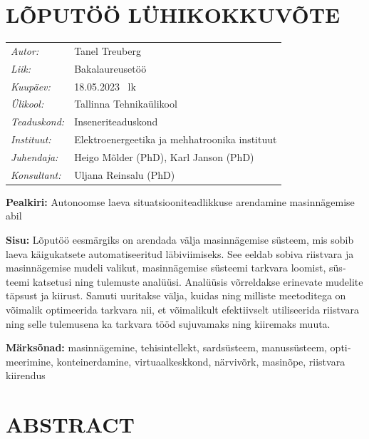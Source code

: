 \documentclass[12pt,a4paper]{report}
\begin{document}
\section*{LÕPUTÖÖ LÜHIKOKKUVÕTE}
\begin{otherlanguage}{estonian}
\noindent
\begin{tabular}{@{}ll@{}}
  \emph{Autor:}     & Tanel Treuberg \\
  \emph{Liik:}      & Bakalaureusetöö \\
  \emph{Kuupäev:}   & 18.05.2023 \quad 58~lk \\
  \emph{Ülikool:}   & Tallinna Tehnikaülikool \\
  \emph{Teaduskond:}& Inseneriteaduskond \\
  \emph{Instituut:} & Elektroenergeetika ja mehhatroonika instituut \\
  \emph{Juhendaja:} & Heigo Mõlder (PhD), Karl Janson (PhD) \\
  \emph{Konsultant:}& Uljana Reinsalu (PhD) \\
\end{tabular}

\vspace{0.5em}
\noindent\textbf{Pealkiri:} Autonoomse laeva situatsiooniteadlikkuse arendamine masinnägemise abil

\vspace{0.5em}
\noindent\textbf{Sisu:} Lõputöö eesmärgiks on arendada välja masinnägemise süsteem, mis sobib
laeva käigukatsete automatiseeritud läbiviimiseks. See eeldab sobiva riistvara ja masinnägemise
mudeli valikut, masinnägemise süsteemi tarkvara loomist, süsteemi katsetusi ning tulemuste
analüüsi. Analüüsis võrreldakse erinevate mudelite täpsust ja kiirust. Samuti uuritakse välja,
kuidas ning milliste meetoditega on võimalik optimeerida tarkvara nii, et võimalikult efektiivselt
utiliseerida riistvara ning selle tulemusena ka tarkvara tööd sujuvamaks ning kiiremaks muuta.

\vspace{0.5em}
\noindent\textbf{Märksõnad:} masinnägemine, tehisintellekt, sardsüsteem, manussüsteem,
optimeerimine, konteinerdamine, virtuaalkeskkond, närvivõrk, masinõpe, riistvara kiirendus
\end{otherlanguage}

\section*{ABSTRACT}
\end{document}
